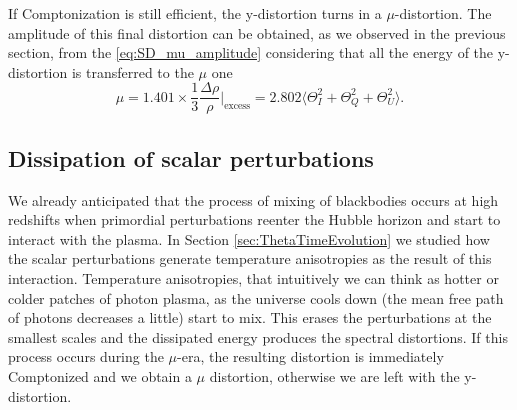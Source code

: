 If Comptonization is still efficient, the y-distortion turns in a $\mu$-distortion. The amplitude of this final distortion can be obtained, as we observed in the previous section, from the \eqref{eq:SD_mu_amplitude} considering that all the energy of the y-distortion is transferred to the $\mu$ one
\begin{equation}
    \label{eq:mu-distortion_polarized}
    \mu=1.401\times\frac{1}{3}\frac{\Delta\rho}{\rho}\bigg|_\text{excess}=2.802\Big\langle\Theta^2_I+\Theta^2_Q+\Theta^2_U\Big\rangle.
\end{equation}

\subsection{Dissipation of scalar perturbations}
\label{sec:diss_scalar}
We already anticipated that the process of mixing of blackbodies occurs at high redshifts when primordial perturbations reenter the Hubble horizon and start to interact with the plasma. In Section \ref{sec:ThetaTimeEvolution} we studied how the scalar perturbations generate temperature anisotropies as the result of this interaction. Temperature anisotropies, that intuitively we can think as hotter or colder patches of photon plasma, as the universe cools down (the mean free path of photons decreases a little) start to mix. This erases the perturbations at the smallest scales and the dissipated energy produces the spectral distortions. If this process occurs during the $\mu$-era, the resulting distortion is immediately Comptonized and we obtain a $\mu$ distortion, otherwise we are left with the y-distortion.

